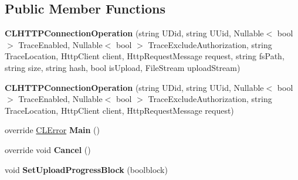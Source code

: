 \subsection*{Public Member Functions}
\begin{DoxyCompactItemize}
\item 
\hypertarget{class_cloud_api_public_1_1_support_1_1_c_l_h_t_t_p_connection_operation_a2156cfc5f0cd607b996e9d0ea7eea8a9}{{\bfseries C\-L\-H\-T\-T\-P\-Connection\-Operation} (string U\-Did, string U\-Uid, Nullable$<$ bool $>$ Trace\-Enabled, Nullable$<$ bool $>$ Trace\-Exclude\-Authorization, string Trace\-Location, Http\-Client client, Http\-Request\-Message request, string fs\-Path, string size, string hash, bool is\-Upload, File\-Stream upload\-Stream)}\label{class_cloud_api_public_1_1_support_1_1_c_l_h_t_t_p_connection_operation_a2156cfc5f0cd607b996e9d0ea7eea8a9}

\item 
\hypertarget{class_cloud_api_public_1_1_support_1_1_c_l_h_t_t_p_connection_operation_a2f59e5f0bfcf6b528dc2d9a59f7ca4b1}{{\bfseries C\-L\-H\-T\-T\-P\-Connection\-Operation} (string U\-Did, string U\-Uid, Nullable$<$ bool $>$ Trace\-Enabled, Nullable$<$ bool $>$ Trace\-Exclude\-Authorization, string Trace\-Location, Http\-Client client, Http\-Request\-Message request)}\label{class_cloud_api_public_1_1_support_1_1_c_l_h_t_t_p_connection_operation_a2f59e5f0bfcf6b528dc2d9a59f7ca4b1}

\item 
\hypertarget{class_cloud_api_public_1_1_support_1_1_c_l_h_t_t_p_connection_operation_a7fff4f709a9ef518fc081f8f6f23c182}{override \hyperlink{class_cloud_api_public_1_1_model_1_1_c_l_error}{C\-L\-Error} {\bfseries Main} ()}\label{class_cloud_api_public_1_1_support_1_1_c_l_h_t_t_p_connection_operation_a7fff4f709a9ef518fc081f8f6f23c182}

\item 
\hypertarget{class_cloud_api_public_1_1_support_1_1_c_l_h_t_t_p_connection_operation_a3ecad9e095e74e18ee2a5dcde65a4d48}{override void {\bfseries Cancel} ()}\label{class_cloud_api_public_1_1_support_1_1_c_l_h_t_t_p_connection_operation_a3ecad9e095e74e18ee2a5dcde65a4d48}

\item 
\hypertarget{class_cloud_api_public_1_1_support_1_1_c_l_h_t_t_p_connection_operation_a24c84375328a14c844a5a77dc3f50256}{void {\bfseries Set\-Upload\-Progress\-Block} (boolblock)}\label{class_cloud_api_public_1_1_support_1_1_c_l_h_t_t_p_connection_operation_a24c84375328a14c844a5a77dc3f50256}


\end{DoxyCompactItemize}
